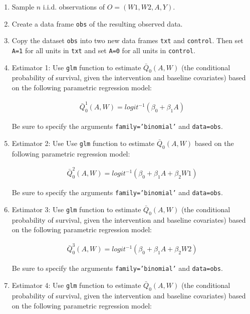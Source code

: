 \documentclass{article}\usepackage[]{graphicx}\usepackage[]{xcolor}
\begin{document}
  \begin{enumerate}[label=\textbf{\alph*.}]
  
    \item Sample $n$ i.i.d. observations of $O = (W1,W2,A,Y)$.
    
    \item Create a data frame \texttt{obs} of the resulting observed data.
    
    \item Copy the dataset \texttt{obs} into two new data frames \texttt{txt} and \texttt{control}. Then set \texttt{A=1} for all units in \texttt{txt} and set \texttt{A=0} for all units in \texttt{control}.
    
    \item Estimator 1: Use \texttt{glm} function to estimate $\bar{Q}_0(A,W)$ (the conditional probability of survival, given the intervention and baseline covariates) based on the following parametric regression model:
    
\begin{align*}
\bar{Q}^1_0(A,W)=logit^{-1}(\beta_0+\beta_1A)
\end{align*}

Be sure to specify the arguments \texttt{family='binomial'} and \texttt{data=obs}.

    \item Estimator 2: Use Use \texttt{glm} function to estimate $\bar{Q}_0(A,W)$ based on the following parametric regression model:
    
\begin{align*}
\bar{Q}^2_0(A,W)=logit^{-1}(\beta_0+\beta_1A+\beta_2W1)
\end{align*}

Be sure to specify the arguments \texttt{family='binomial'} and \texttt{data=obs}.

    \item Estimator 3: Use \texttt{glm} function to estimate $\bar{Q}_0(A,W)$ (the conditional probability of survival, given the intervention and baseline covariates) based on the following parametric regression model:
    
\begin{align*}
\bar{Q}^3_0(A,W)=logit^{-1}(\beta_0+\beta_1A+\beta_2W2)
\end{align*}

Be sure to specify the arguments \texttt{family='binomial'} and \texttt{data=obs}.
    
    \item Estimator 4: Use \texttt{glm} function to estimate $\bar{Q}_0(A,W)$ (the conditional probability of survival, given the intervention and baseline covariates) based on the following parametric regression model:
    

\end{enumerate}
\end{document}
